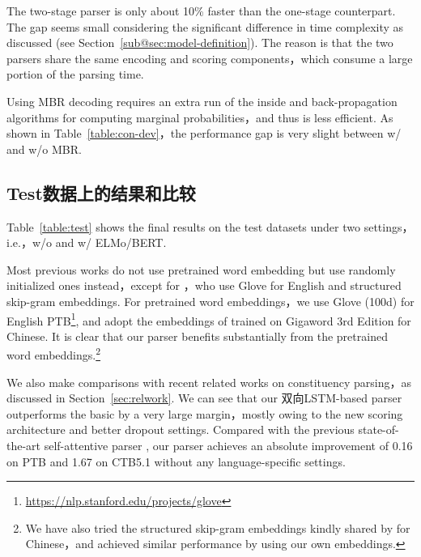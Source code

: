 The two-stage parser is only about 10\% faster than the one-stage counterpart. The gap seems small considering the significant difference in time complexity as discussed (see Section~\ref{sub@sec:model-definition}).
The reason is that the two parsers share the same encoding and scoring components，which consume a large portion of the parsing time.

Using MBR decoding requires an extra run of the inside and back-propagation algorithms for computing marginal probabilities，and thus is less efficient.
As shown in Table~\ref{table:con-dev}，the performance gap is very slight between w/ and w/o MBR.

\subsection{Test数据上的结果和比较}
Table~\ref{table:test} shows the final results on the test datasets under two settings，i.e.，w/o and w/ ELMo/BERT.

Most previous works do not use pretrained word embedding but use randomly initialized ones instead，except for \cite{zhou-zhao-2019-head}，who use Glove for English and structured skip-gram embeddings.
For pretrained word embeddings，we use Glove (100d) %
for English PTB\footnote{\url{https://nlp.stanford.edu/projects/glove}},
and adopt the embeddings of \cite{li-etal-2019-attentive} trained on Gigaword 3rd Edition for Chinese.
It is clear that our parser benefits substantially from the pretrained word embeddings.\footnote{
    We have also tried the structured skip-gram embeddings kindly shared by \cite{zhou-zhao-2019-head} for Chinese，and achieved similar performance by using our own embeddings.
}

We also make comparisons with recent related works on constituency parsing，as discussed in Section~\ref{sec:relwork}.
We can see that our 双向LSTM-based parser outperforms the basic \cite{stern-etal-2017-minimal} by a very large margin，mostly owing to the new scoring architecture and better dropout settings.
Compared with the previous state-of-the-art self-attentive parser \cite{kitaev-klein-2018-constituency},
our parser achieves an absolute improvement of 0.16 on PTB and 1.67 on CTB5.1 without any language-specific settings.

